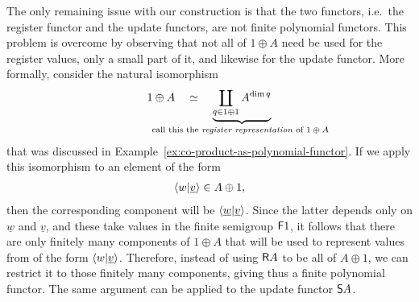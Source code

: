 The only remaining issue with our construction is that the two functors, i.e.~the register functor and the update functors, are not finite polynomial functors. This problem is overcome by observing that not all of $1 \oplus A$ need be used for the register values, only a small part of it, and likewise for the update functor. More formally, 
consider the natural isomorphism
\begin{align*}
1 \oplus A  \quad \simeq \quad 
\myunderbrace{\coprod_{q \in 1 \oplus 1}  A^{\dim q}}{call this the \emph{register representation} of $1 \oplus A$}
\end{align*}
that was discussed in Example~\ref{ex:co-product-as-polynomial-functor}. If we apply this isomorphism to an element of the form 
\begin{align*}
\langle w|\underline {v} \rangle \in A \oplus 1,
\end{align*}
then the corresponding component will be $\langle \underline w | \underline v \rangle$. Since the latter depends only  on $\underline w$ and $\underline v$, and these take values in the finite semigroup $\mathsf F 1$, it follows that there are only finitely many components of $1 \oplus A$ that will be used to represent values from of the form $\langle w | \underline v \rangle$. Therefore, instead of using $\mathsf R A$ to be all of $A \oplus 1$, we can restrict it to those finitely many components, giving thus a finite polynomial functor. The same argument can be applied to the update functor $\mathsf S A$.